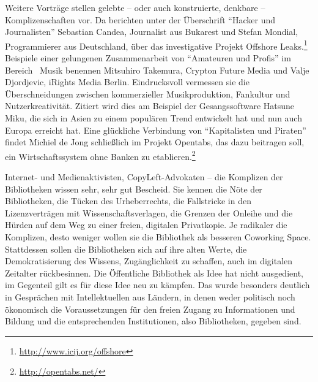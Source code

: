 \documentclass[a4paper,
fontsize=11pt,
oneside,
numbers=noperiodatend,
parskip=half-,
bibliography=totoc,
final
]{scrartcl}
\begin{document}
Weitere Vorträge stellen gelebte -- oder auch konstruierte, denkbare --
Komplizenschaften vor. Da berichten unter der Überschrift
\enquote{Hacker und Journalisten} Sebastian Candea, Journalist aus
Bukarest und Stefan Mondial, Programmierer aus Deutschland, über das
investigative Projekt Offshore Leaks.\footnote{\url{http://www.icij.org/offshore}}
Beispiele einer gelungenen Zusammenarbeit von \enquote{Amateuren und
Profis} im Bereich~ Musik benennen Mitsuhiro Takemura, Crypton Future
Media und Valje Djordjevic, iRights Media Berlin. Eindrucksvoll
vermessen sie die Überschneidungen zwischen kommerzieller
Musikproduktion, Fankultur und Nutzerkreativität. Zitiert wird dies am
Beispiel der Gesangssoftware Hatsune Miku, die sich in Asien zu einem
populären Trend entwickelt hat und nun auch Europa erreicht hat. Eine
glückliche Verbindung von \enquote{Kapitalisten und Piraten} findet
Michiel de Jong schließlich im Projekt Opentabs, das dazu beitragen
soll, ein Wirtschaftssystem ohne Banken zu etablieren.\footnote{\url{http://opentabs.net/}}

Internet- und Medienaktivisten, CopyLeft-Advokaten -- die Komplizen der
Bibliotheken wissen sehr, sehr gut Bescheid. Sie kennen die Nöte der
Bibliotheken, die Tücken des Urheberrechts, die Fallstricke in den
Lizenzverträgen mit Wissenschaftsverlagen, die Grenzen der Onleihe und
die Hürden auf dem Weg zu einer freien, digitalen Privatkopie. Je
radikaler die Komplizen, desto weniger wollen sie die Bibliothek als
besseren Coworking Space. Stattdessen sollen die Bibliotheken sich auf
ihre alten Werte, die Demokratisierung des Wissens, Zugänglichkeit zu
schaffen, auch im digitalen Zeitalter rückbesinnen. Die Öffentliche
Bibliothek als Idee hat nicht ausgedient, im Gegenteil gilt es für diese
Idee neu zu kämpfen. Das wurde besonders deutlich in Gesprächen mit
Intellektuellen aus Ländern, in denen weder politisch noch ökonomisch
die Voraussetzungen für den freien Zugang zu Informationen und Bildung
und die entsprechenden Institutionen, also Bibliotheken, gegeben sind.
\end{document}

